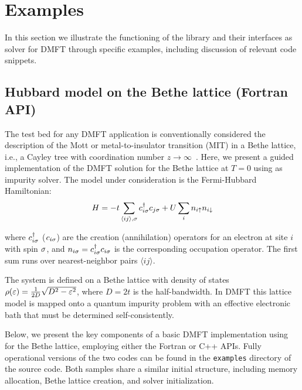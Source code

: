 \documentclass[edipack2.tex]{subfiles}
\begin{document}
\section{Examples}\label{SecExamples}
In this section we illustrate the functioning of the \NAME
library and their interfaces as solver for DMFT through specific examples, including
discussion of relevant code snippets. 


\subsection{Hubbard model on the Bethe lattice (Fortran API)}\label{SecExamplesBetheDMFT}
The test bed for any DMFT application is conventionally considered 
the description of the Mott or metal-to-insulator transition (MIT) 
in a Bethe lattice, i.e., a Cayley tree with coordination number 
$z\to\infty$~\cite{Georges1996}.
Here, we present a guided implementation of the DMFT 
solution for the Bethe lattice at $T=0$ using \NAME as impurity
solver.
The model under consideration is the Fermi-Hubbard Hamiltonian:
$$
H = -t \sum_{\langle ij\rangle,\sigma} c^\dagger_{i\sigma} c_{j\sigma} + 
    U \sum_i n_{i\uparrow}n_{i\downarrow}
    $$
    
where $c^\dagger_{i\sigma}$ ($c_{i\sigma}$) are the creation (annihilation) 
operators for an electron at site $i$ with spin $\sigma$, and 
$n_{i\sigma} = c^\dagger_{i\sigma} c_{i\sigma}$ is the corresponding occupation 
operator. The first sum runs over nearest-neighbor pairs 
$\langle ij \rangle$.

The system is defined on a Bethe lattice with density of states
$\rho(\varepsilon)=\frac{1}{2D}\sqrt{D^2-\varepsilon^2}$,
where $D=2t$ is the half-bandwidth.
In DMFT this lattice model is mapped onto a quantum impurity problem with 
an effective electronic bath that must be determined
self-consistently.

Below, we present the key components of a basic DMFT implementation 
using \NAME for the Bethe lattice, employing either the Fortran or 
C++ APIs. Fully operational versions of the two codes can be found 
in the {\tt examples} directory of the \NAME source code. Both 
samples share a similar initial structure, including memory 
allocation, Bethe lattice creation, and solver initialization.
\end{document}
